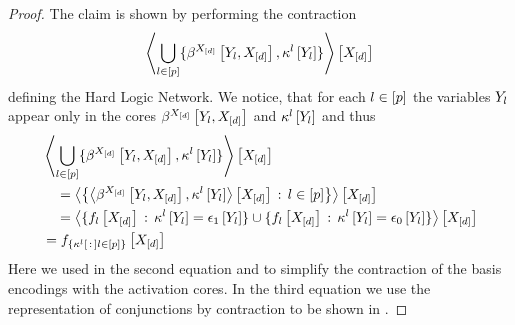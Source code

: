 \begin{proof}
    The claim is shown by performing the contraction
    \begin{align*}
        \left\langle 
            \bigcup_{l\in[p]}\{\beta^{X_{[d]}}\left[Y_{l},X_{[d]}\right],\kappa^{l}\left[Y_{l}\right]\}
        \right\rangle \left[ X_{[d]} \right]
    \end{align*}
    defining the Hard Logic Network.
    We notice, that for each $l\in[p]$ the variables $Y_{l}$ appear only in the cores $\beta^{X_{[d]}}\left[Y_{l},X_{[d]}\right]$ and $\kappa^{l}\left[Y_{l}\right]$ and thus
    \begin{align*}
        & \left\langle 
            \bigcup_{l\in[p]}\{\beta^{X_{[d]}}\left[Y_{l},X_{[d]}\right],\kappa^{l}\left[Y_{l}\right]\}
        \right\rangle \left[ X_{[d]} \right] \\
        & \quad =    \left\langle 
            \left\{
            \left\langle \beta^{X_{[d]}}\left[Y_{l},X_{[d]}\right],\kappa^{l}\left[Y_{l}\right]\right\rangle \left[ X_{[d]} \right]
            \,:\,l\in[p]\right\}
        \right\rangle \left[ X_{[d]} \right] \\
        & \quad = \left\langle 
            \{
            f_{l}\left[X_{[d]}\right]
            \,:\,\kappa^{l}\left[Y_{l}\right] = \epsilon_1\left[Y_{l}\right]
            \}
            \cup
            \{
            f_{l}\left[X_{[d]}\right]
            \,:\,\kappa^{l}\left[Y_{l}\right] = \epsilon_0\left[Y_{l}\right]
            \}
        \right\rangle \left[ X_{[d]} \right] \\
        & = f_{\{\kappa^{l}\left[\,:\,\right]l\in[p]\}}\left[X_{[d]}\right]
    \end{align*}
    Here we used in the second equation  and  to simplify the contraction of the basis encodings with the activation cores.
    In the third equation we use the representation of conjunctions by contraction to be shown in .
\end{proof}

